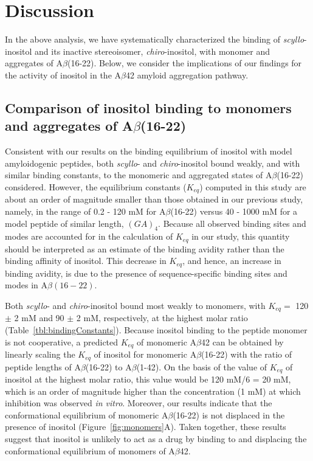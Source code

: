 
\section{Discussion}
In the above analysis, we have systematically characterized the binding of \emph{scyllo}-inositol and its inactive stereoisomer, \emph{chiro}-inositol, with monomer and aggregates of A$\beta$(16-22). Below, we consider the implications of our findings for the activity of inositol in the A$\beta$42 amyloid aggregation pathway.

\subsection{Comparison of inositol binding to monomers and aggregates of A$\beta$(16-22)}
Consistent with our results on the binding equilibrium of inositol with model amyloidogenic peptides,\cite{Li:2012p853} both \emph{scyllo}- and \emph{chiro}-inositol bound weakly, and with similar binding constants, to the monomeric and aggregated states of A$\beta$(16-22) considered. %
However, the equilibrium constants ($K_{eq}$) computed in this study are about an order of magnitude smaller than those obtained in our previous study, namely, in the range of 0.2 - 120 mM for A$\beta$(16-22) versus 40 - 1000 mM for a model peptide of similar length, $(GA)_4$.\cite{Li:2012p853} Because all observed binding sites and modes are accounted for in the calculation of $K_{eq}$ in our study, this quantity should be interpreted as an estimate of the binding avidity rather than the binding affinity of inositol.  This decrease in $K_{eq}$, and hence, an increase in binding avidity, is due to the presence of sequence-specific binding sites and modes in A$\beta(16-22)$.

Both \emph{scyllo}- and \emph{chiro}-inositol bound most weakly to monomers, with $K_{eq}=$ 120 $\pm$ 2 mM and 90 $\pm$ 2 mM, respectively, at the highest molar ratio (Table~\ref{tbl:bindingConstants}). Because inositol binding to the peptide monomer is not cooperative, a predicted $K_{eq}$ of monomeric A$\beta$42 can be obtained by linearly scaling the $K_{eq}$ of inositol for monomeric A$\beta$(16-22) with the ratio of peptide lengths of A$\beta$(16-22) to A$\beta$(1-42).  On the basis of the value of $K_{eq}$ of inositol at the highest molar ratio, this value would be 120 mM/6 = 20 mM, which is an order of magnitude higher than the concentration (1 mM) at which inhibition was observed \emph{in vitro}.\cite{McLaurin:2000p64}  Moreover, our results indicate that the conformational equilibrium of monomeric A$\beta$(16-22) is not displaced in the presence of inositol (Figure~\ref{fig:monomers}A). Taken together, these results suggest that inositol is unlikely to act as a drug by binding to and displacing the conformational equilibrium of monomers of A$\beta$42.

